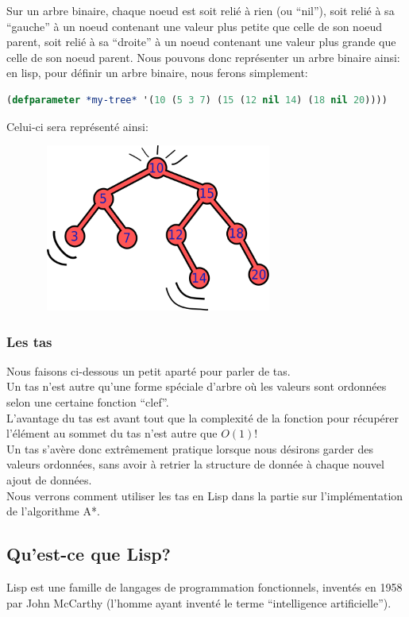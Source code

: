 \documentclass[a4paper, 12pt]{article}
\numberwithin{equation}{subsection}
\begin{document}
Sur un arbre binaire, chaque noeud est soit relié à rien (ou ``nil''), soit relié à sa ``gauche'' à un noeud contenant une valeur plus petite que celle de son noeud parent, soit relié à sa ``droite'' à un noeud contenant une valeur plus grande que celle de son noeud parent. Nous pouvons donc représenter un arbre binaire ainsi: \\

en lisp, pour définir un arbre binaire, nous ferons simplement:
\begin{lstlisting}[language=Lisp]
(defparameter *my-tree* '(10 (5 3 7) (15 (12 nil 14) (18 nil 20))))
\end{lstlisting}
Celui-ci sera représenté ainsi: \\
\begin{figure}[H]
  \centering
  \includegraphics[width=8.0cm, height=5.5cm]{imgs/tree.png}
\end{figure}
\subsubsection{Les tas}
Nous faisons ci-dessous un petit aparté pour parler de tas. \\

Un tas n'est autre qu'une forme spéciale d'arbre où les valeurs sont ordonnées selon une certaine fonction ``clef''. \\

L'avantage du tas est avant tout que la complexité de la fonction pour récupérer l'élément au sommet du tas n'est autre que $O(1)$! \\

Un tas s'avère donc extrêmement pratique lorsque nous désirons garder des valeurs ordonnées, sans avoir à retrier la structure de donnée à chaque nouvel ajout de données. \\

Nous verrons comment utiliser les tas en Lisp dans la partie sur l'implémentation de l'algorithme A*.
\subsection{Qu'est-ce que Lisp?}
Lisp est une famille de langages de programmation fonctionnels, inventés en 1958 par John McCarthy (l'homme ayant inventé le terme ``intelligence artificielle''). \\
\end{document}
